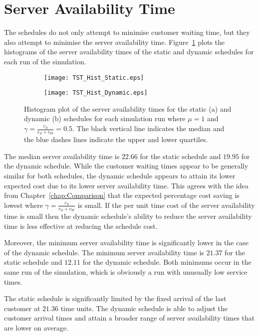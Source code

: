 \section{Server Availability Time}
The schedules do not only attempt to minimise customer waiting time, but they also attempt to minimise the server availability time. Figure~\ref{fig:Two_Server} plots the histograms of the server availability times of the static and dynamic schedules for each run of the simulation.
\begin{figure}[htb]
	\centering
	\begin{subfigure}[t]{0.45\textwidth}
		\centering
		\texttt{[image: TST\_Hist\_Static.eps]}
		\caption{}
	\end{subfigure}
	\begin{subfigure}[t]{0.45\textwidth}
		\centering
		\texttt{[image: TST\_Hist\_Dynamic.eps]}
		\caption{}
	\end{subfigure}
	\caption{Histogram plot of the server availability times for the static (a) and dynamic (b) schedules for each simulation run where $\mu = 1$ and $\gamma = \frac{c_{S}}{c_{S} + c_{W}} = 0.5$. The black vertical line indicates the median and the blue dashes lines indicate the upper and lower quartiles.}
	\label{fig:Two_Server}
\end{figure}

The median server availability time is $22.66$ for the static schedule and $19.95$ for the dynamic schedule. While the customer waiting times appear to be generally similar for both schedules, the dynamic schedule appears to attain its lower expected cost due to its lower server availability time. This agrees with the idea from Chapter~\ref{chap:Comparison} that the expected percentage cost saving is lowest where $\gamma = \frac{c_{S}}{c_{S} + c_{W}}$ is small. If the per unit time cost of the server availability time is small then the dynamic schedule's ability to reduce the server availability time is less effective at reducing the schedule cost.

Moreover, the minimum server availability time is significantly lower in the case of the dynamic schedule. The minimum server availability time is $21.37$ for the static schedule and $12.11$ for the dynamic schedule. Both minimums occur in the same run of the simulation, which is obviously a run with unusually low service times.

The static schedule is significantly limited by the fixed arrival of the last customer at $21.36$ time units. The dynamic schedule is able to adjust the customer arrival times and attain a broader range of server availability times that are lower on average.